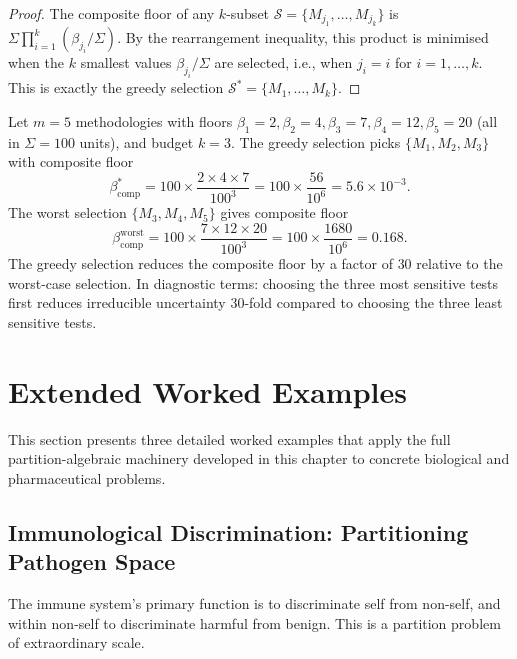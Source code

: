 \begin{proof}
The composite floor of any $k$-subset $\mathcal{S} = \{M_{j_1}, \ldots,
M_{j_k}\}$ is $\Sigma \prod_{i=1}^k(\beta_{j_i}/\Sigma)$.  By the rearrangement
inequality, this product is minimised when the $k$ smallest values
$\beta_{j_i}/\Sigma$ are selected, i.e., when $j_i = i$ for $i = 1, \ldots, k$.
This is exactly the greedy selection $\mathcal{S}^* = \{M_1, \ldots, M_k\}$.
\end{proof}

\begin{example}
\label{ex:ch02-greedy-numerical}
Let $m = 5$ methodologies with floors $\beta_1 = 2, \beta_2 = 4, \beta_3 = 7,
\beta_4 = 12, \beta_5 = 20$ (all in $\Sigma = 100$ units), and budget $k = 3$.
The greedy selection picks $\{M_1, M_2, M_3\}$ with composite floor
\[
  \beta_{\mathrm{comp}}^* = 100 \times \frac{2 \times 4 \times 7}{100^3}
  = 100 \times \frac{56}{10^6}
  = 5.6 \times 10^{-3}.
\]
The worst selection $\{M_3, M_4, M_5\}$ gives composite floor
\[
  \beta_{\mathrm{comp}}^{\mathrm{worst}} = 100 \times \frac{7 \times 12 \times 20}{100^3}
  = 100 \times \frac{1680}{10^6}
  = 0.168.
\]
The greedy selection reduces the composite floor by a factor of $30$ relative
to the worst-case selection.  In diagnostic terms: choosing the three most
sensitive tests first reduces irreducible uncertainty $30$-fold compared to
choosing the three least sensitive tests.
\end{example}

\section{Extended Worked Examples}
\label{sec:ch02-worked-examples-extended}

This section presents three detailed worked examples that apply the full
partition-algebraic machinery developed in this chapter to concrete biological
and pharmaceutical problems.

\subsection{Immunological Discrimination: Partitioning Pathogen Space}

The immune system's primary function is to discriminate self from non-self,
and within non-self to discriminate harmful from benign.  This is a partition
problem of extraordinary scale.


